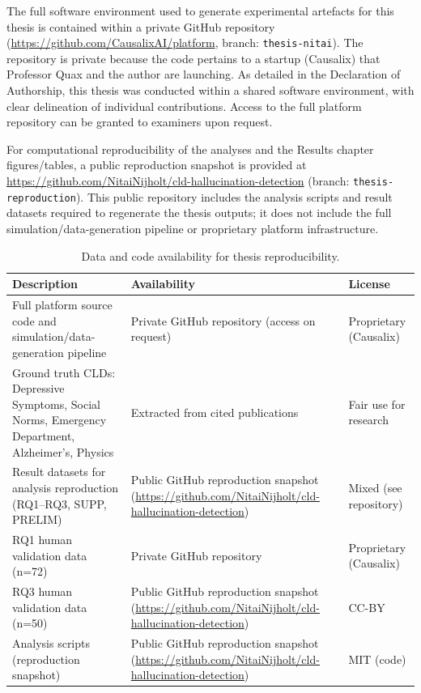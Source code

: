 The full software environment used to generate experimental artefacts for this thesis is contained within a private GitHub repository (\url{https://github.com/CausalixAI/platform}, branch: \texttt{thesis-nitai}). The repository is private because the code pertains to a startup (Causalix) that Professor Quax and the author are launching. As detailed in the Declaration of Authorship, this thesis was conducted within a shared software environment, with clear delineation of individual contributions. Access to the full platform repository can be granted to examiners upon request.

For computational reproducibility of the analyses and the Results chapter figures/tables, a public reproduction snapshot is provided at \url{https://github.com/NitaiNijholt/cld-hallucination-detection} (branch: \texttt{thesis-reproduction}). This public repository includes the analysis scripts and result datasets required to regenerate the thesis outputs; it does not include the full simulation/data-generation pipeline or proprietary platform infrastructure.

\begin{table}[ht]
\centering
\begin{tabularx}{\textwidth}{|>{\raggedright\arraybackslash}X|>{\raggedright\arraybackslash}X|>{\raggedright\arraybackslash}p{3cm}|}
\hline
\textbf{Description} & \textbf{Availability} & \textbf{License} \\
\hline
Full platform source code and simulation/data-generation pipeline & Private GitHub repository (access on request) & Proprietary (Causalix) \\
\hline
Ground truth CLDs: Depressive Symptoms, Social Norms, Emergency Department, Alzheimer's, Physics & Extracted from cited publications & Fair use for research \\
\hline
Result datasets for analysis reproduction (RQ1--RQ3, SUPP, PRELIM) & Public GitHub reproduction snapshot (\url{https://github.com/NitaiNijholt/cld-hallucination-detection}) & Mixed (see repository) \\
\hline
RQ1 human validation data (n=72) & Private GitHub repository & Proprietary (Causalix) \\
\hline
RQ3 human validation data (n=50) & Public GitHub reproduction snapshot (\url{https://github.com/NitaiNijholt/cld-hallucination-detection}) & CC-BY \\
\hline
Analysis scripts (reproduction snapshot) & Public GitHub reproduction snapshot (\url{https://github.com/NitaiNijholt/cld-hallucination-detection}) & MIT (code) \\
\hline
\end{tabularx}
\caption{Data and code availability for thesis reproducibility.}
\label{tab:data_availability}
\end{table}

